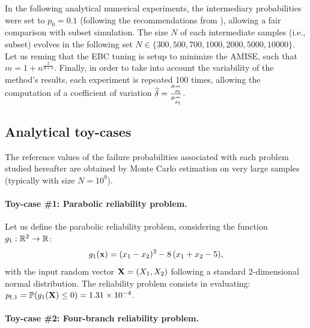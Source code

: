 In the following analytical numerical experiments, the intermediary probabilities were set to $p_0=0.1$ (following the recommendations from \citet{AuBeck2001}), allowing a fair comparison with subset simulation. 
The size $N$ of each intermediate samples (i.e., subset) evolves in the following set $N\in \{300, 500, 700, 1000, 2000, 5000, 10 000\}$. 
Let us reming that the EBC tuning is setup to minimize the AMISE, such that $m = 1 + n^{\frac{2}{d+4}}$. 
Finally, in order to take into account the variability of the method's results, each experiment is repeated 100 times, allowing the computation of a coefficient of variation $\widehat{\delta} = \frac{\sigma_{\widehat{p_\mathrm{f}}}}{\mu_{\widehat{p_\mathrm{f}}}}$. 

\subsection{Analytical toy-cases}
The reference values of the failure probabilities associated with each problem studied hereafter are obtained by Monte Carlo estimation on very large samples (typically with size $N = 10^9$). 

\paragraph{Toy-case \#1: Parabolic reliability problem.}

Let us define the parabolic reliability problem, considering the function $g_1: \mathbb{R}^2 \rightarrow \mathbb{R}$:
\begin{equation}
    g_1({\bf x})= (x_1 - x_2) ^ 2 - 8 \, (x_1 + x_2 - 5),
\end{equation}
with the input random vector ${\bf X} = (X_1, X_2)$ following a standard 2-dimensional normal distribution. 
The reliability problem consists in evaluating: $p_{\mathrm{f}, 1} = \mathbb{P} ( g_1({\bf X}) \leq 0 ) = 1.31 \times 10^{-4}$.

\paragraph{Toy-case \#2: Four-branch reliability problem.}

